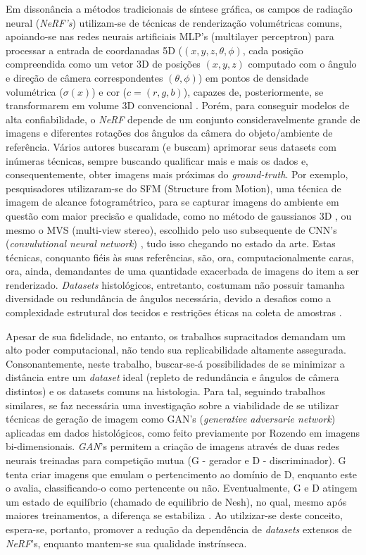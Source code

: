 Em dissonância a métodos tradicionais de síntese gráfica, os campos de radiação neural (\textit{NeRF's}) utilizam-se de técnicas de renderização volumétricas comuns, apoiando-se nas redes neurais artificiais MLP's (multilayer perceptron) para processar a entrada de coordanadas 5D ($(x, y, z, \theta, \phi)$, cada posição compreendida como um vetor 3D de posições $(x, y, z)$ computado com o ângulo e direção de câmera correspondentes $(\theta, \phi)$) em pontos de densidade volumétrica ($\sigma (x)$) e cor ($c = (r, g, b)$), capazes de, posteriormente, se transformarem em volume 3D convencional \cite{mildenhall2020nerfrepresentingscenesneural}. Porém, para conseguir modelos de alta confiabilidade, o \textit{NeRF} depende de um conjunto consideravelmente grande de imagens e diferentes rotações dos ângulos da câmera do objeto/ambiente de referência. Vários autores buscaram (e buscam) aprimorar seus datasets com inúmeras técnicas, sempre buscando qualificar mais e mais os dados e, consequentemente, obter imagens mais próximas do \textit{ground-truth}. Por exemplo, pesquisadores utilizaram-se do SFM  (Structure from Motion), uma técnica de imagem de alcance fotogramétrico, para se capturar imagens do ambiente em questão com maior precisão e qualidade, como no método de gaussianos 3D \cite{kerbl3Dgaussians}, ou mesmo o MVS (multi-view stereo), escolhido pelo uso subsequente de CNN's (\textit{convulutional neural network}) \cite{chen2021mvsnerffastgeneralizableradiance}, tudo isso chegando no estado da arte. Estas técnicas, conquanto fiéis às suas referências, são, ora, computacionalmente caras, ora, ainda, demandantes de uma quantidade exacerbada de imagens do item a ser renderizado. \textit{Datasets} histológicos, entretanto, costumam não possuir tamanha diversidade ou redundância de ângulos necessária, devido a desafios como a complexidade estrutural dos tecidos e restrições éticas na coleta de amostras \cite{XUE2021101816}.

Apesar de sua fidelidade, no entanto, os trabalhos supracitados demandam um alto poder computacional, não tendo sua replicabilidade altamente assegurada. Consonantemente, neste trabalho, buscar-se-á possibilidades de se minimizar a distância entre um \textit{dataset} ideal (repleto de redundância e ângulos de câmera distintos) e os datasets comuns na histologia. Para tal, seguindo trabalhos similares, se faz necessária uma investigação sobre a viabilidade de se utilizar técnicas de geração de imagem como GAN's (\textit{generative adversarie network}) aplicadas em dados histológicos, como feito previamente por Rozendo \cite{rozendo2024histdataaug} em imagens bi-dimensionais.   \textit{GAN}'s  permitem a criação de imagens através de duas redes neurais treinadas para competição mutua (G - gerador e  D - discriminador). G tenta criar imagens que emulam o pertencimento ao domínio de D, enquanto este o avalia, classificando-o como pertencente ou não. Eventualmente, G e D atingem um estado de equilíbrio (chamado de equilibrio de Nesh), no qual, mesmo após maiores treinamentos, a diferença se estabiliza \cite{goodfellow2014generativeadversarialnetworks} . Ao utilzizar-se deste conceito, espera-se, portanto, promover a redução da dependência de \textit{datasets} extensos de \textit{NeRF}'s, enquanto mantem-se sua qualidade instrínseca.
